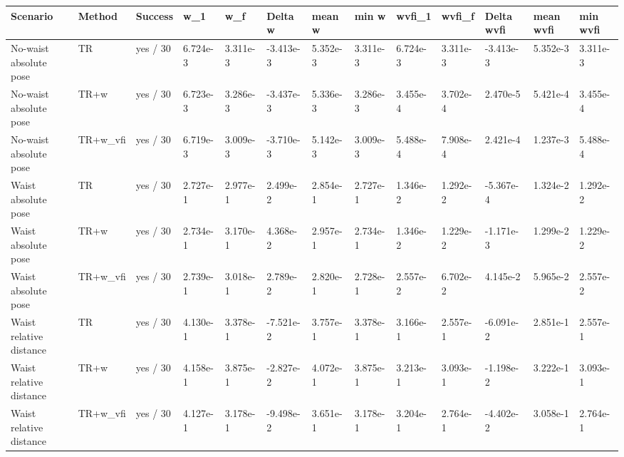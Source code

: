 \begin{tabular}{lllllllllllll}
\toprule
Scenario & Method & Success & w\_1 & w\_f & Delta w & mean w & min w & wvfi\_1 & wvfi\_f & Delta wvfi & mean wvfi & min wvfi \\
\midrule
No-waist absolute pose & TR & yes / 30 & 6.724e-3 & 3.311e-3 & -3.413e-3 & 5.352e-3 & 3.311e-3 & 6.724e-3 & 3.311e-3 & -3.413e-3 & 5.352e-3 & 3.311e-3 \\
No-waist absolute pose & TR+w & yes / 30 & 6.723e-3 & 3.286e-3 & -3.437e-3 & 5.336e-3 & 3.286e-3 & 3.455e-4 & 3.702e-4 & 2.470e-5 & 5.421e-4 & 3.455e-4 \\
No-waist absolute pose & TR+w\_vfi & yes / 30 & 6.719e-3 & 3.009e-3 & -3.710e-3 & 5.142e-3 & 3.009e-3 & 5.488e-4 & 7.908e-4 & 2.421e-4 & 1.237e-3 & 5.488e-4 \\
Waist absolute pose & TR & yes / 30 & 2.727e-1 & 2.977e-1 & 2.499e-2 & 2.854e-1 & 2.727e-1 & 1.346e-2 & 1.292e-2 & -5.367e-4 & 1.324e-2 & 1.292e-2 \\
Waist absolute pose & TR+w & yes / 30 & 2.734e-1 & 3.170e-1 & 4.368e-2 & 2.957e-1 & 2.734e-1 & 1.346e-2 & 1.229e-2 & -1.171e-3 & 1.299e-2 & 1.229e-2 \\
Waist absolute pose & TR+w\_vfi & yes / 30 & 2.739e-1 & 3.018e-1 & 2.789e-2 & 2.820e-1 & 2.728e-1 & 2.557e-2 & 6.702e-2 & 4.145e-2 & 5.965e-2 & 2.557e-2 \\
Waist relative distance & TR & yes / 30 & 4.130e-1 & 3.378e-1 & -7.521e-2 & 3.757e-1 & 3.378e-1 & 3.166e-1 & 2.557e-1 & -6.091e-2 & 2.851e-1 & 2.557e-1 \\
Waist relative distance & TR+w & yes / 30 & 4.158e-1 & 3.875e-1 & -2.827e-2 & 4.072e-1 & 3.875e-1 & 3.213e-1 & 3.093e-1 & -1.198e-2 & 3.222e-1 & 3.093e-1 \\
Waist relative distance & TR+w\_vfi & yes / 30 & 4.127e-1 & 3.178e-1 & -9.498e-2 & 3.651e-1 & 3.178e-1 & 3.204e-1 & 2.764e-1 & -4.402e-2 & 3.058e-1 & 2.764e-1 \\
\bottomrule
\end{tabular}
